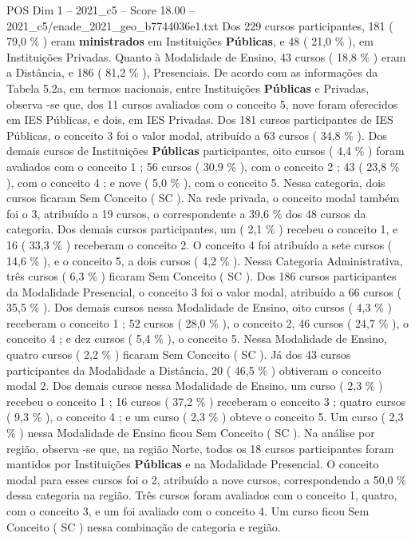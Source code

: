 \begin{textsample}{POS Dim 1 – 2021\_c5 – Score 18.00 – 2021\_c5/enade\_2021\_geo\_b7744036e1.txt}
Dos 229 cursos participantes, 181 ( 79,0 \% ) eram \textbf{ministrados} em Instituições \textbf{Públicas}, e 48 ( 21,0 \% ), em Instituições Privadas.
Quanto à Modalidade de Ensino, 43 cursos ( 18,8 \% ) eram a Distância, e 186 ( 81,2 \% ), Presenciais.
De acordo com as informações da Tabela 5.2a, em termos nacionais, entre Instituições \textbf{Públicas} e Privadas, observa -se que, dos 11 cursos avaliados com o conceito 5, nove foram oferecidos em IES Públicas, e dois, em IES Privadas.
Dos 181 cursos participantes de IES Públicas, o conceito 3 foi o valor modal, atribuído a 63 cursos ( 34,8 \% ).
Dos demais cursos de Instituições \textbf{Públicas} participantes, oito cursos ( 4,4 \% ) foram avaliados com o conceito 1 ; 56 cursos ( 30,9 \% ), com o conceito 2 ; 43 ( 23,8 \% ), com o conceito 4 ; e nove ( 5,0 \% ), com o conceito 5.
Nessa categoria, dois cursos ficaram Sem Conceito ( SC ).
Na rede privada, o conceito modal também foi o 3, atribuído a 19 cursos, o correspondente a 39,6 \% dos 48 cursos da categoria.
Dos demais cursos participantes, um ( 2,1 \% ) recebeu o conceito 1, e 16 ( 33,3 \% ) receberam o conceito 2.
O conceito 4 foi atribuído a sete cursos ( 14,6 \% ), e o conceito 5, a dois cursos ( 4,2 \% ).
Nessa Categoria Administrativa, três cursos ( 6,3 \% ) ficaram Sem Conceito ( SC ).
Dos 186 cursos participantes da Modalidade Presencial, o conceito 3 foi o valor modal, atribuído a 66 cursos ( 35,5 \% ).
Dos demais cursos nessa Modalidade de Ensino, oito cursos ( 4,3 \% ) receberam o conceito 1 ; 52 cursos ( 28,0 \% ), o conceito 2, 46 cursos ( 24,7 \% ), o conceito 4 ; e dez cursos ( 5,4 \% ), o conceito 5.
Nessa Modalidade de Ensino, quatro cursos ( 2,2 \% ) ficaram Sem Conceito ( SC ).
Já dos 43 cursos participantes da Modalidade a Distância, 20 ( 46,5 \% ) obtiveram o conceito modal 2.
Dos demais cursos nessa Modalidade de Ensino, um curso ( 2,3 \% ) recebeu o conceito 1 ; 16 cursos ( 37,2 \% ) receberam o conceito 3 ; quatro cursos ( 9,3 \% ), o conceito 4 ; e um curso ( 2,3 \% ) obteve o conceito 5.
Um curso ( 2,3 \% ) nessa Modalidade de Ensino ficou Sem Conceito ( SC ).
Na análise por região, observa -se que, na região Norte, todos os 18 cursos participantes foram mantidos por Instituições \textbf{Públicas} e na Modalidade Presencial.
O conceito modal para esses cursos foi o 2, atribuído a nove cursos, correspondendo a 50,0 \% dessa categoria na região.
Três cursos foram avaliados com o conceito 1, quatro, com o conceito 3, e um foi avaliado com o conceito 4.
Um curso ficou Sem Conceito ( SC ) nessa combinação de categoria e região.

\end{textsample}
